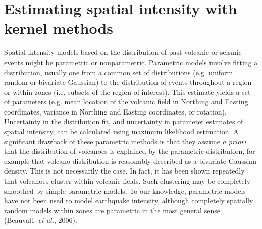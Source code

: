 \documentclass[10pt]{article}
\begin{document}
\section{Estimating spatial intensity with kernel methods}
Spatial intensity models based on the distribution of past volcanic or seismic events might be parametric or nonparametric. Parametric models involve fitting a distribution, usually one from a common set of distributions (e.g. uniform random or bivariate Gaussian) to the distribution of events throughout a region or within zones (i.e. subsets of the region of interest). This estimate yields a set of parameters (e.g. mean location of the volcanic field in Northing and Easting coordinates, variance in Northing and Easting coordinates, or rotation). Uncertainty in the distribution fit, and uncertainty in parameter estimates of spatial intensity, can be calculated using maximum likelihood estimation. A significant drawback of these parametric methods is that they assume {\it a priori} that the distribution of volcanoes is explained by the parametric distribution, for example that volcano distribution is reasonably described as a bivariate Gaussian density. This is not necessarily the case. In fact, it has been shown repeatedly that volcanoes cluster within volcanic fields. Such clustering may be completely smoothed by simple parametric models. To our knowledge, parametric models have not been used to model earthquake intensity, although completely spatially random models within zones are parametric in the most general sense (Beauval1~{\it et al.}, 2006).
\end{document}
